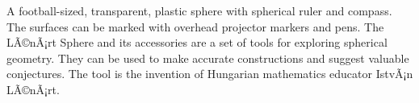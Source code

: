 A football-sized, transparent, plastic sphere with spherical ruler and compass. The surfaces can be marked with overhead projector markers and pens. The  LÃ©nÃ¡rt Sphere and its accessories are a set of tools for exploring spherical geometry. They can be used to make accurate constructions and suggest valuable conjectures. The tool is the invention of Hungarian mathematics educator IstvÃ¡n LÃ©nÃ¡rt.